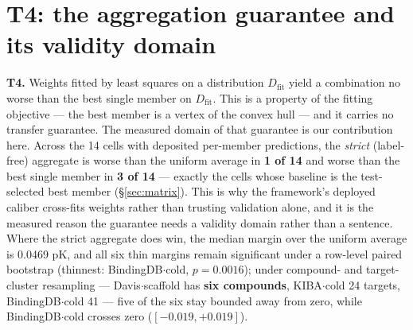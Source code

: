 \documentclass[10pt,letterpaper]{article}
\begin{document}
\section{T4: the aggregation guarantee and its validity domain}
\label{sec:t4}

\textbf{T4.} Weights fitted by least squares on a distribution $D_{\text{fit}}$ yield
a combination no worse than the best single member on $D_{\text{fit}}$. This is a
property of the fitting objective --- the best member is a vertex of the convex
hull \citep{bates1969, wolpert1992, breiman1996} --- and it carries no transfer
guarantee. The measured domain of that guarantee is our contribution here. Across
the 14 cells with deposited per-member predictions, the \emph{strict} (label-free)
aggregate is worse than the uniform average in \textbf{1 of 14} and worse than the
best single member in \textbf{3 of 14} --- exactly the cells whose baseline is the
test-selected best member (\S\ref{sec:matrix}). This is why the framework's deployed
caliber cross-fits weights rather than trusting validation alone, and it is the
measured reason the guarantee needs a validity domain rather than a sentence. Where
the strict aggregate does win, the median margin over the uniform average is 0.0469 pK,
and all six thin margins remain significant under a row-level paired bootstrap
(thinnest: BindingDB$\cdot$cold, $p = 0.0016$); under compound- and target-cluster
resampling --- Davis$\cdot$scaffold has \textbf{six compounds}, KIBA$\cdot$cold 24
targets, BindingDB$\cdot$cold 41 --- five of the six stay bounded away from zero,
while BindingDB$\cdot$cold crosses zero ($[-0.019,+0.019]$).
\end{document}
